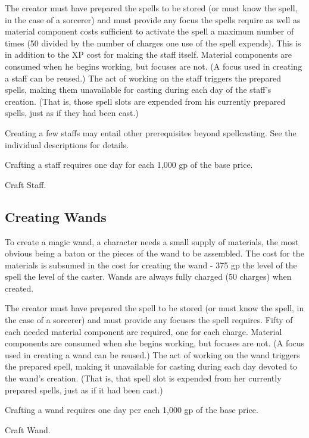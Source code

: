 The creator must have prepared the spells to be stored (or must know the spell, in the case of a sorcerer) and must provide any focus the spells require as well as material component costs sufficient to activate the spell a maximum number of times (50 divided by the number of charges one use of the spell expends). This is in addition to the XP cost for making the staff itself. Material components are consumed when he begins working, but focuses are not. (A focus used in creating a staff can be reused.) The act of working on the staff triggers the prepared spells, making them unavailable for casting during each day of the staff's creation. (That is, those spell slots are expended from his currently prepared spells, just as if they had been cast.)

Creating a few staffs may entail other prerequisites beyond spellcasting. See the individual descriptions for details.

Crafting a staff requires one day for each 1,000 gp of the base price.

 Craft Staff.

\subsection{Creating Wands}

To create a magic wand, a character needs a small supply of materials, the most obvious being a baton or the pieces of the wand to be assembled. The cost for the materials is subsumed in the cost for creating the wand - 375 gp \x the level of the spell \x the level of the caster. Wands are always fully charged (50 charges) when created.

The creator must have prepared the spell to be stored (or must know the spell, in the case of a sorcerer) and must provide any focuses the spell requires. Fifty of each needed material component are required, one for each charge. Material components are consumed when she begins working, but focuses are not. (A focus used in creating a wand can be reused.) The act of working on the wand triggers the prepared spell, making it unavailable for casting during each day devoted to the wand's creation. (That is, that spell slot is expended from her currently prepared spells, just as if it had been cast.)

Crafting a wand requires one day per each 1,000 gp of the base price.

 Craft Wand.

